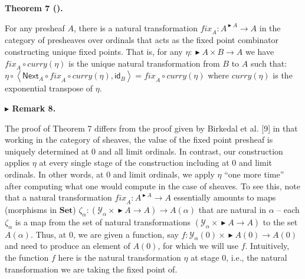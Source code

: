  
 
\par\medskip\noindent\textbf{Theorem 7 ().}\par
 
 
For any presheaf $A$, there is a natural transformation $\mathit{fix}_{A}:A^{\mathop{\blacktriangleright}{}A}\to A$ in the category of presheaves over ordinals that acts as the fixed point combinator constructing unique fixed points. That is, for any $\eta:\mathop{\blacktriangleright}{}A\times B\to A$ we have $\mathit{fix}_{A}\circ\mathit{curry}\left(\eta\right)$ is the unique natural transformation from $B$ to $A$ such that: $\eta\circ\left<\mathsf{Next}_{A}\circ\mathit{fix}_{A}\circ\mathit{curry}\left(\eta\right),\mathsf{id}_{B}\right>=\mathit{fix}_{A}\circ\mathit{curry}\left(\eta\right)$ where $\mathit{curry}\left(\eta\right)$ is the exponential transpose of $\eta$.\par
 
 
 
 
\par\medskip\noindent\textbf{$\blacktriangleright$ Remark 8.}\par
 
 
The proof of Theorem 7 differs from the proof given by Birkedal et al. [9] in that working in the category of sheaves, the value of the fixed point presheaf is uniquely determined at 0 and all limit ordinals. In contrast, our construction applies $\eta$ at every single stage of the construction including at 0 and limit ordinals. In other words, at 0 and limit ordinals, we apply $\eta$ “one more time” after computing what one would compute in the case of sheaves. To see this, note that a natural transformation $\mathit{fix}_{A}:A^{\mathop{\blacktriangleright}{}A}\to A$ essentially amounts to maps (morphisms in $\mathbf{Set}{}$) $\zeta_{\alpha}:(\mathcal{Y}_{\alpha}\times\mathop{\blacktriangleright}{}A\to A)\to A(\alpha)$ that are natural in $\alpha$ – each $\zeta_{\alpha}$ is a map from the set of natural transformations $(\mathcal{Y}_{\alpha}\times\mathop{\blacktriangleright}{}A\to A)$ to the set $A(\alpha)$. Thus, at 0, we are given a function, say $f:\mathcal{Y}_{\alpha}(0)\times\mathop{\blacktriangleright}{}A(0)\to A(0)$ and need to produce an element of $A(0)$, for which we will use $f$. Intuitively, the function $f$ here is the natural transformation $\eta$ at stage 0, i.e., the natural transformation we are taking the fixed point of.\par
 
